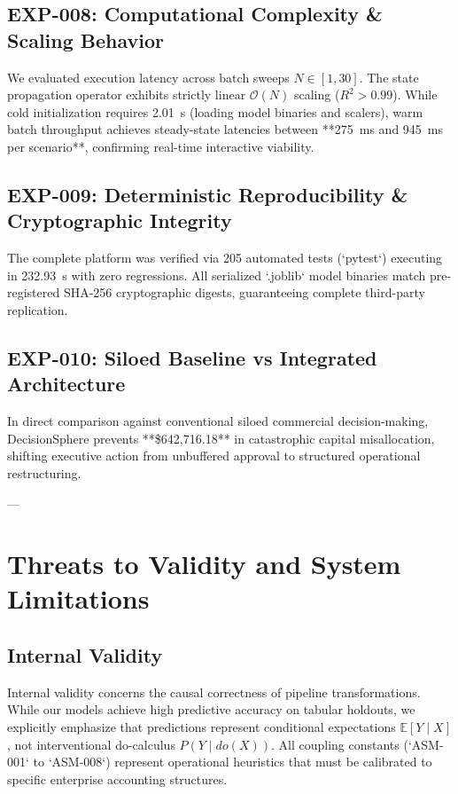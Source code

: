 \documentclass[journal]{IEEEtran}
\begin{document}
\subsection{EXP-008: Computational Complexity & Scaling Behavior}
We evaluated execution latency across batch sweeps $N \in [1, 30]$. The state propagation operator exhibits strictly linear $\mathcal{O}(N)$ scaling ($R^2 > 0.99$). While cold initialization requires 2.01~s (loading model binaries and scalers), warm batch throughput achieves steady-state latencies between **275~ms and 945~ms per scenario**, confirming real-time interactive viability.

\subsection{EXP-009: Deterministic Reproducibility & Cryptographic Integrity}
The complete platform was verified via 205 automated tests (`pytest`) executing in 232.93~s with zero regressions. All serialized `.joblib` model binaries match pre-registered SHA-256 cryptographic digests, guaranteeing complete third-party replication.

\subsection{EXP-010: Siloed Baseline vs Integrated Architecture}
In direct comparison against conventional siloed commercial decision-making, DecisionSphere prevents **\$642,716.18** in catastrophic capital misallocation, shifting executive action from unbuffered approval to structured operational restructuring.

---

\section{Threats to Validity and System Limitations}

\subsection{Internal Validity}
Internal validity concerns the causal correctness of pipeline transformations. While our models achieve high predictive accuracy on tabular holdouts, we explicitly emphasize that predictions represent conditional expectations $\mathbb{E}[Y \mid X]$, not interventional do-calculus $P(Y \mid do(X))$. All coupling constants (`ASM-001` to `ASM-008`) represent operational heuristics that must be calibrated to specific enterprise accounting structures.
\end{document}

